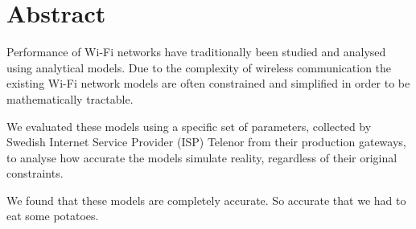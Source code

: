 
\chapter*{Abstract}

Performance of Wi-Fi networks have traditionally been studied and analysed using analytical models. Due to the complexity of wireless communication the existing Wi-Fi network models are often constrained and simplified in order to be mathematically tractable.

We evaluated these models using a specific set of parameters, collected by Swedish Internet Service Provider (ISP) Telenor from their production gateways, to analyse how accurate the models simulate reality, regardless of their original constraints.\cite{bianchi}

We found that these models are completely accurate. So accurate that we had to eat some potatoes.